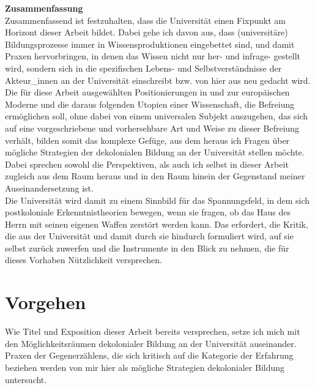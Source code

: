 \textbf{\large Zusammenfassung}\\
Zusammenfassend ist festzuhalten, dass die
Universität einen Fixpunkt am Horizont dieser Arbeit bildet. Dabei gehe ich
davon aus, dass (universitäre) Bildungsprozesse immer in Wissensproduktionen
eingebettet sind, und damit Praxen hervorbringen, in denen das Wissen nicht nur
her- und infrage- gestellt wird, sondern sich in die spezifischen Lebens- und
Selbstverständnisse der Akteur\_innen an der Universität einschreibt bzw. von
hier aus neu gedacht wird.\\
Die für diese Arbeit ausgewählten Positionierungen in und zur europäischen
Moderne und die daraus folgenden Utopien einer Wissenschaft, die Befreiung
ermöglichen soll, ohne dabei von einem universalen Subjekt auszugehen, das sich
auf eine vorgeschriebene und vorhersehbare Art und Weise zu dieser Befreiung
verhält, bilden somit das komplexe Gefüge, aus dem heraus ich Fragen über
mögliche Strategien der dekolonialen Bildung an der Universität stellen möchte.\\
Dabei sprechen sowohl die Perspektiven, als auch ich selbst in dieser Arbeit
zugleich aus dem Raum heraus und in den Raum hinein der Gegenstand meiner
Auseinandersetzung ist. \\
Die Universität wird damit zu einem Sinnbild für das
Spannungsfeld, in dem sich postkoloniale Erkenntnistheorien bewegen, wenn sie
fragen, ob das Haus des Herrn mit seinen eigenen Waffen zerstört werden
kann.\footnotemark {} Das erfordert, die Kritik, die aus der Universität und damit durch sie hindurch formuliert wird, auf sie selbst zurück zuwerfen und die Instrumente in den Blick zu nehmen, die für dieses Vorhaben Nützlichkeit versprechen.

\section{Vorgehen}

Wie Titel und Exposition dieser Arbeit bereits versprechen, setze ich mich mit
den Möglichkeitsräumen dekolonialer Bildung an der Universität auseinander.
Praxen der Gegenerzählens, die sich kritisch auf die Kategorie der Erfahrung
beziehen werden von mir hier als mögliche Strategien dekolonialer Bildung
untersucht.\\

